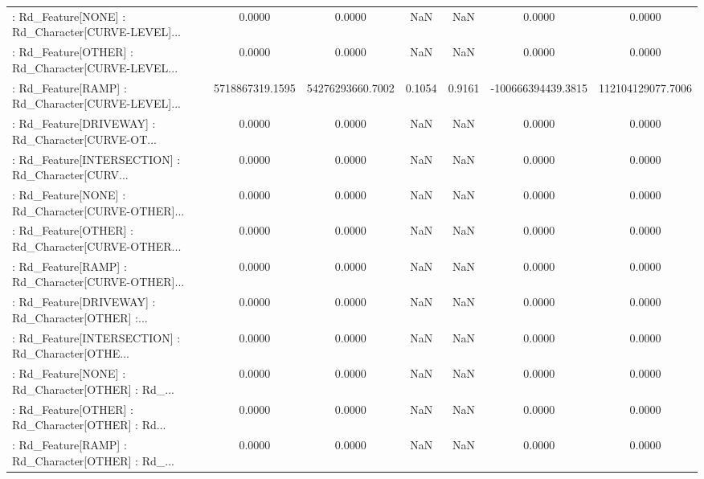 \begin{longtable}{p{4cm}cccccc}
 : Rd\_Feature[NONE] : Rd\_Character[CURVE-LEVEL]... &            0.0000 &            0.0000 &     NaN &          NaN &             0.0000 &            0.0000 \\
 : Rd\_Feature[OTHER] : Rd\_Character[CURVE-LEVEL... &            0.0000 &            0.0000 &     NaN &          NaN &             0.0000 &            0.0000 \\
 : Rd\_Feature[RAMP] : Rd\_Character[CURVE-LEVEL]... &   5718867319.1595 &  54276293660.7002 &  0.1054 &       0.9161 & -100666394439.3815 & 112104129077.7006 \\
 : Rd\_Feature[DRIVEWAY] : Rd\_Character[CURVE-OT... &            0.0000 &            0.0000 &     NaN &          NaN &             0.0000 &            0.0000 \\
 : Rd\_Feature[INTERSECTION] : Rd\_Character[CURV... &            0.0000 &            0.0000 &     NaN &          NaN &             0.0000 &            0.0000 \\
 : Rd\_Feature[NONE] : Rd\_Character[CURVE-OTHER]... &            0.0000 &            0.0000 &     NaN &          NaN &             0.0000 &            0.0000 \\
 : Rd\_Feature[OTHER] : Rd\_Character[CURVE-OTHER... &            0.0000 &            0.0000 &     NaN &          NaN &             0.0000 &            0.0000 \\
 : Rd\_Feature[RAMP] : Rd\_Character[CURVE-OTHER]... &            0.0000 &            0.0000 &     NaN &          NaN &             0.0000 &            0.0000 \\
 : Rd\_Feature[DRIVEWAY] : Rd\_Character[OTHER] :... &            0.0000 &            0.0000 &     NaN &          NaN &             0.0000 &            0.0000 \\
 : Rd\_Feature[INTERSECTION] : Rd\_Character[OTHE... &            0.0000 &            0.0000 &     NaN &          NaN &             0.0000 &            0.0000 \\
 : Rd\_Feature[NONE] : Rd\_Character[OTHER] : Rd\_... &            0.0000 &            0.0000 &     NaN &          NaN &             0.0000 &            0.0000 \\
 : Rd\_Feature[OTHER] : Rd\_Character[OTHER] : Rd... &            0.0000 &            0.0000 &     NaN &          NaN &             0.0000 &            0.0000 \\
 : Rd\_Feature[RAMP] : Rd\_Character[OTHER] : Rd\_... &            0.0000 &            0.0000 &     NaN &          NaN &             0.0000 &            0.0000 \\

\end{longtable}
